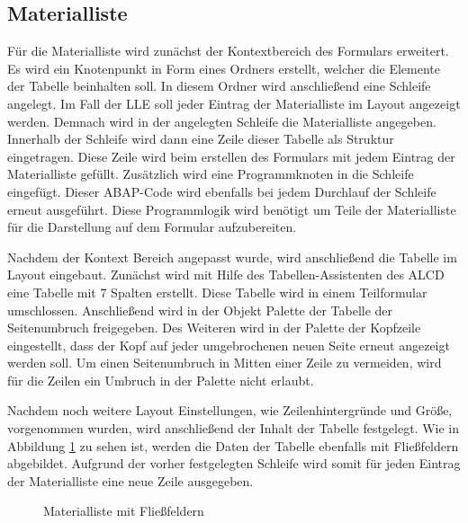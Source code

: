 {	
	\FloatBarrier
\subsection{Materialliste}




Für die Materialliste wird zunächst der Kontextbereich des Formulars erweitert. Es wird ein Knotenpunkt in Form eines Ordners erstellt, welcher die Elemente der Tabelle beinhalten soll. In diesem Ordner wird anschließend eine Schleife angelegt. Im Fall der \ac{LLE} soll jeder Eintrag der Materialliste im Layout angezeigt werden. Demnach wird in der angelegten Schleife die Materialliste angegeben. Innerhalb der Schleife wird dann eine Zeile dieser Tabelle als Struktur eingetragen. Diese Zeile wird beim erstellen des Formulars mit jedem Eintrag der Materialliste gefüllt. Zusätzlich wird eine Programmknoten in die Schleife eingefügt. Dieser \ac{ABAP}-Code wird ebenfalls bei jedem Durchlauf der Schleife erneut ausgeführt. Diese Programmlogik wird benötigt um Teile der Materialliste für die Darstellung auf dem Formular aufzubereiten.

Nachdem der Kontext Bereich angepasst wurde, wird anschließend die Tabelle im Layout eingebaut. Zunächst wird mit Hilfe des Tabellen-Assistenten des \ac{ALCD} eine Tabelle mit 7 Spalten erstellt. Diese Tabelle wird in einem Teilformular umschlossen. Anschließend wird in der Objekt Palette der Tabelle der Seitenumbruch freigegeben. Des Weiteren wird in der Palette der Kopfzeile eingestellt, dass der Kopf auf jeder umgebrochenen neuen Seite erneut angezeigt werden soll. Um einen Seitenumbruch in Mitten einer Zeile zu vermeiden, wird für die Zeilen ein Umbruch in der Palette nicht erlaubt. 

Nachdem noch weitere Layout Einstellungen, wie Zeilenhintergründe und Größe, vorgenommen wurden, wird anschließend der Inhalt der Tabelle festgelegt. Wie in Abbildung \ref{figTab} zu sehen ist, werden die Daten der Tabelle ebenfalls mit Fließfeldern abgebildet. Aufgrund der vorher festgelegten Schleife wird somit für jeden Eintrag der Materialliste eine neue Zeile ausgegeben.

\begin{figure}[ht]
	\centering
	\caption{Materialliste mit Fließfeldern}
	\label{figTab}
	

\end{figure}}
